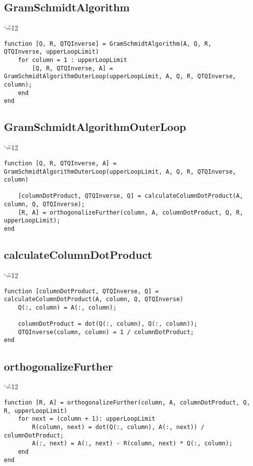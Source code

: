 \documentclass[12pt]{report}
\newenvironment{simplechar}{%
   \catcode`\^=12
}{}
\begin{document}
\subsection{GramSchmidtAlgorithm}
\begin{simplechar}
\begin{lstlisting}
function [Q, R, QTQInverse] = GramSchmidtAlgorithm(A, Q, R, QTQInverse, upperLoopLimit)
    for column = 1 : upperLoopLimit
        [Q, R, QTQInverse, A] = GramSchmidtAlgorithmOuterLoop(upperLoopLimit, A, Q, R, QTQInverse, column);
    end
end
\end{lstlisting}
\end{simplechar}

\subsection{GramSchmidtAlgorithmOuterLoop}
\begin{simplechar}
\begin{lstlisting}
function [Q, R, QTQInverse, A] = GramSchmidtAlgorithmOuterLoop(upperLoopLimit, A, Q, R, QTQInverse, column)

    [columnDotProduct, QTQInverse, Q] = calculateColumnDotProduct(A, column, Q, QTQInverse);
    [R, A] = orthogonalizeFurther(column, A, columnDotProduct, Q, R, upperLoopLimit);
end
\end{lstlisting}
\end{simplechar}

\subsection{calculateColumnDotProduct}
\begin{simplechar}
\begin{lstlisting}
function [columnDotProduct, QTQInverse, Q] = calculateColumnDotProduct(A, column, Q, QTQInverse)
    Q(:, column) = A(:, column);

    columnDotProduct = dot(Q(:, column), Q(:, column));
    QTQInverse(column, column) = 1 / columnDotProduct;
end
\end{lstlisting}
\end{simplechar}

\subsection{orthogonalizeFurther}
\begin{simplechar}
\begin{lstlisting}
function [R, A] = orthogonalizeFurther(column, A, columnDotProduct, Q, R, upperLoopLimit)
    for next = (column + 1): upperLoopLimit
        R(column, next) = dot(Q(:, column), A(:, next)) / columnDotProduct;
        A(:, next) = A(:, next) - R(column, next) * Q(:, column);
    end
end
\end{lstlisting}
\end{simplechar}
\end{document}
